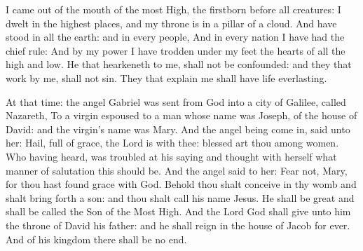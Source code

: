 \bigskip




I came out of the mouth of the most High, the firstborn before all
creatures:
I dwelt in the highest places, and my throne is in a pillar of a
cloud.
And have stood in all the earth: and in every people,
And in every nation I have had the chief rule:
And by my power I have trodden under my feet the hearts of all
the high and low.
He that hearkeneth to me, shall not be confounded: and they that
work by me, shall not sin.
They that explain me shall have life everlasting.




At that time: the angel Gabriel was sent from God into a
city of Galilee, called Nazareth,
To a virgin espoused to a man whose name was Joseph, of the house
of David: and the virgin's name was Mary.
And the angel being come in, said unto her: Hail, full of grace,
the Lord is with thee: blessed art thou among women.
Who having heard, was troubled at his saying and thought with
herself what manner of salutation this should be.
And the angel said to her: Fear not, Mary, for thou hast found
grace with God.
Behold thou shalt conceive in thy womb and shalt bring forth a
son: and thou shalt call his name Jesus.
He shall be great and shall be called the Son of the Most High.
And the Lord God shall give unto him the throne of David his father: and
he shall reign in the house of Jacob for ever.
And of his kingdom there shall be no end.



\bigskip




